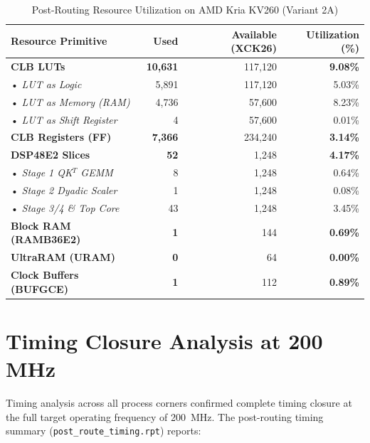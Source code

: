 \begin{table}[htbp]
    \centering
    \caption{Post-Routing Resource Utilization on AMD Kria KV260 (Variant 2A)}
    \label{tab:post_route_util}
    \begin{tabularx}{\textwidth}{l r r r}
        \toprule
        \textbf{Resource Primitive} & \textbf{Used} & \textbf{Available (XCK26)} & \textbf{Utilization (\%)} \\
        \midrule
        \textbf{CLB LUTs}               & \textbf{10,631} & 117,120 & \textbf{9.08\%} \\
        • \textit{LUT as Logic}         & 5,891           & 117,120 & 5.03\% \\
        • \textit{LUT as Memory (RAM)}  & 4,736           & 57,600  & 8.23\% \\
        • \textit{LUT as Shift Register}& 4               & 57,600  & 0.01\% \\
        \textbf{CLB Registers (FF)}     & \textbf{7,366}  & 234,240 & \textbf{3.14\%} \\
        \textbf{DSP48E2 Slices}         & \textbf{52}     & 1,248   & \textbf{4.17\%} \\
        • \textit{Stage 1 QK$^T$ GEMM}  & 8               & 1,248   & 0.64\% \\
        • \textit{Stage 2 Dyadic Scaler}& 1               & 1,248   & 0.08\% \\
        • \textit{Stage 3/4 \& Top Core}& 43              & 1,248   & 3.45\% \\
        \textbf{Block RAM (RAMB36E2)}   & \textbf{1}      & 144     & \textbf{0.69\%} \\
        \textbf{UltraRAM (URAM)}        & \textbf{0}      & 64      & \textbf{0.00\%} \\
        \textbf{Clock Buffers (BUFGCE)} & \textbf{1}      & 112     & \textbf{0.89\%} \\
        \bottomrule
    \end{tabularx}
\end{table}

\section{Timing Closure Analysis at 200 MHz}
Timing analysis across all process corners confirmed complete timing closure at the full target operating frequency of 200~MHz. The post-routing timing summary (\texttt{post\_route\_timing.rpt}) reports:


